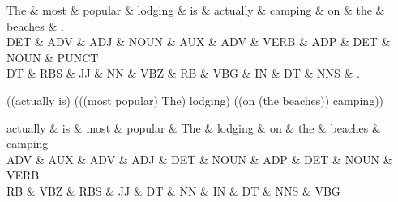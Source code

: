 
\begin{dependency}
\begin{deptext}
The \& most \& popular \& lodging \& is \& actually \& camping \& on \& the \& beaches \& . \\
DET \& ADV \& ADJ \& NOUN \& AUX \& ADV \& VERB \& ADP \& DET \& NOUN \& PUNCT \\
DT \& RBS \& JJ \& NN \& VBZ \& RB \& VBG \& IN \& DT \& NNS \& . \\
\end{deptext}



\end{dependency}

((actually is) (((most popular) The) lodging) ((on (the beaches)) camping))

\begin{dependency}
\begin{deptext}
actually \& is \& most \& popular \& The \& lodging \& on \& the \& beaches \& camping \\
ADV \& AUX \& ADV \& ADJ \& DET \& NOUN \& ADP \& DET \& NOUN \& VERB \\
RB \& VBZ \& RBS \& JJ \& DT \& NN \& IN \& DT \& NNS \& VBG \\
\end{deptext}



\end{dependency}
